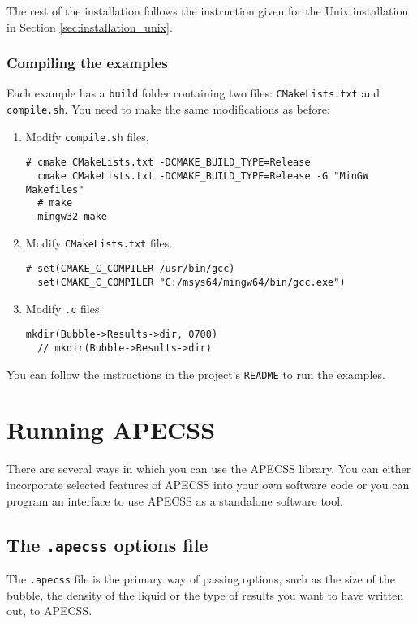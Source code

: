 The rest of the installation follows the instruction given for the Unix installation in Section \ref{sec:installation_unix}. 

\subsubsection*{Compiling the examples}

Each example has a {\tt build} folder containing two files: {\tt CMakeLists.txt} and {\tt compile.sh}. You need to make the same modifications as before:
\vspace{-1em}
\begin{enumerate}[noitemsep]
\item Modify {\tt compile.sh} files,
\begin{lstlisting}[style=CStyle,numbers=none]
  # cmake CMakeLists.txt -DCMAKE_BUILD_TYPE=Release
  cmake CMakeLists.txt -DCMAKE_BUILD_TYPE=Release -G "MinGW Makefiles"
  # make
  mingw32-make\end{lstlisting}
\item  Modify {\tt CMakeLists.txt} files. 
\begin{lstlisting}[style=CStyle,numbers=none]
  # set(CMAKE_C_COMPILER /usr/bin/gcc)
  set(CMAKE_C_COMPILER "C:/msys64/mingw64/bin/gcc.exe")\end{lstlisting}
\item Modify {\tt *.c} files.
\begin{lstlisting}[style=CStyle,numbers=none]
  mkdir(Bubble->Results->dir, 0700)
  // mkdir(Bubble->Results->dir)\end{lstlisting}
\end{enumerate}
You can follow the instructions in the project's {\tt README} to run the examples.


\section{Running APECSS}

There are several ways in which you can use the APECSS library. You can either incorporate selected features of APECSS into your own software code or you can program an interface to use APECSS as a standalone software tool. 

\subsection{The {\tt *.apecss} options file}

The {\tt *.apecss} file is the primary way of passing options, such as the size of the bubble, the density of the liquid or the type of results you want to have written out, to APECSS. 

